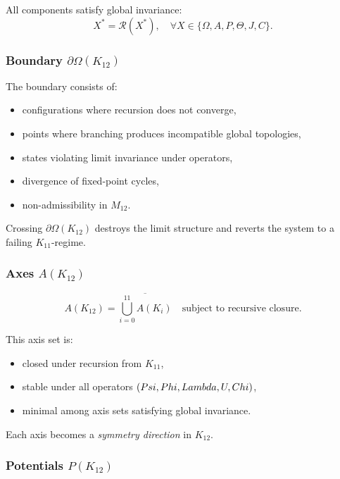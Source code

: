 All components satisfy global invariance:
\[
X^* = \mathcal{R}(X^*),\quad \forall X \in \{\Omega, A, P, \Theta, J, C\}.
\]

\subsubsection{Boundary $\partial\Omega(K_{12})$}

The boundary consists of:
\begin{itemize}
    \item configurations where recursion does not converge,
    \item points where branching produces incompatible global topologies,
    \item states violating limit invariance under operators,
    \item divergence of fixed-point cycles,
    \item non-admissibility in $M_{12}$.
\end{itemize}

Crossing $\partial\Omega(K_{12})$ destroys the limit structure and reverts the
system to a failing $K_{11}$-regime.

\subsubsection{Axes $A(K_{12})$}

\[
A(K_{12}) =
\overline{\bigcup_{i=0}^{11} A(K_i)}
\quad \text{subject to recursive closure}.
\]

This axis set is:
\begin{itemize}
    \item closed under recursion from $K_{11}$,
    \item stable under all operators $(Psi,Phi,Lambda,U,Chi)$,
    \item minimal among axis sets satisfying global invariance.
\end{itemize}

Each axis becomes a \emph{symmetry direction} in $K_{12}$.

\subsubsection{Potentials $P(K_{12})$}

